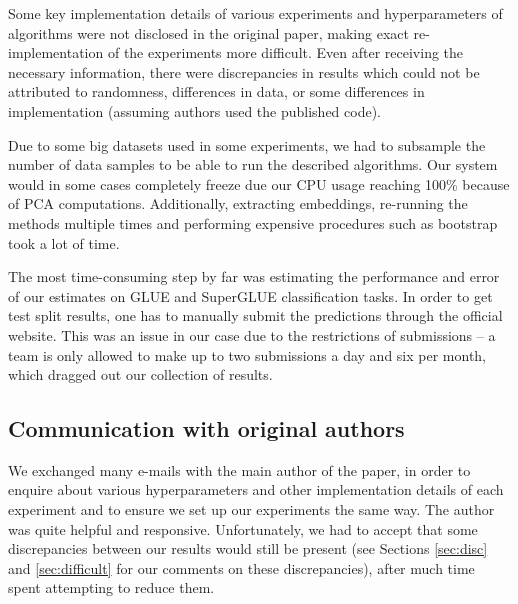 Some key implementation details of various experiments and hyperparameters of algorithms were not disclosed in the original paper, making exact re-implementation of the experiments more difficult. Even after receiving the necessary information, there were discrepancies in results which could not be attributed to randomness, differences in data, or some differences in implementation (assuming authors used the published code). 

Due to some big datasets used in some experiments, we had to subsample the number of data samples to be able to run the described algorithms. Our system would in some cases completely freeze due our CPU usage reaching 100\% because of PCA computations. Additionally, extracting embeddings, re-running the methods multiple times and performing expensive procedures such as bootstrap took a lot of time.

The most time-consuming step by far was estimating the performance and error of our estimates on GLUE and SuperGLUE classification tasks. In order to get test split results, one has to manually submit the predictions through the official website. This was an issue in our case due to the restrictions of submissions -- a team is only allowed to make up to two submissions a day and six per month, which dragged out our collection of results.



\subsection{Communication with original authors}

We exchanged many e-mails with the main author of the paper, in order to enquire about various hyperparameters and other implementation details of each experiment and to ensure we set up our experiments the same way. The author was quite helpful and responsive. Unfortunately, we had to accept that some discrepancies between our results would still be present (see Sections \ref{sec:disc} and \ref{sec:difficult} for our comments on these discrepancies), after much time spent attempting to reduce them.